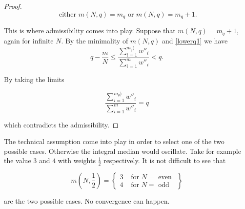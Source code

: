 \documentclass[a4paper,11pt]{article} %
\theoremstyle{definition}
\theoremstyle{remark}
\begin{document}
\begin{proof}
\begin{equation}
\text{ either } m(N,q) = m_{q}  \text{ or } m(N,q) = m_{q} +1.
\end{equation}


This is where admissibility comes into play. Suppose that $m(N,q) = m_{q} +1$, again for infinite $N$. By the minimality of $m(N,q)$  and \ref{lowerq1} we have
\begin{equation}
q - \frac{m}{N} \le \frac{\sum_{i=1}^{m_{q})} w''_{i}}  {\sum_{i=1}^{m} w''_{i}}  <   q.
\end{equation}

By taking the limits

\begin{equation}
\frac{\sum_{i=1}^{m_{q})} w''_{i}}  {\sum_{i=1}^{m} w''_{i}} = q
\end{equation}

which contradicts the admissibility.
\end{proof}


The technical assumption come into play in order to select one of the two possible cases. Otherwise the integral median would oscillate. Take for example the value $3$ and $4$ with weights $\frac{1}{2}$ respectively. It is not difficult to see that

\[
m(N, \frac{1}{2}) =  \left \{ \begin{array}{lr}
3  & \text{ for } N=\text{ even }\\
4  & \text{ for } N=\text{ odd }
\end{array}  \right \}
\]

are the two possible cases. No convergence can happen.
\end{document}
